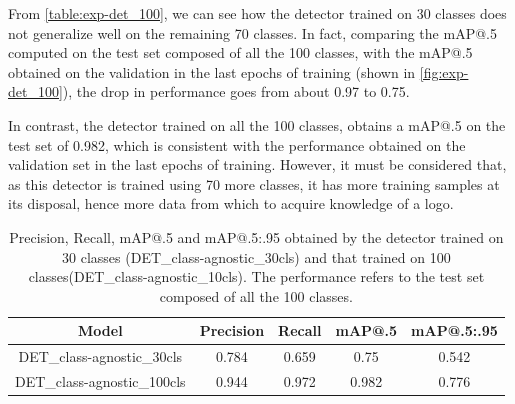 From \autoref{table:exp-det_100}, we can see how the detector trained on 30 classes does not generalize well on the remaining 70 classes.
In fact, comparing the mAP@.5 computed on the test set composed of all the 100 classes, with the mAP@.5 obtained on the validation in the last epochs of training (shown in \autoref{fig:exp-det_100}), the drop in performance goes from about 0.97 to 0.75.

In contrast, the detector trained on all the 100 classes, obtains a mAP@.5 on the test set of 0.982, which is consistent with the performance obtained on the validation set in the last epochs of training.
However, it must be considered that, as this detector is trained using 70 more classes, it has more training samples at its disposal, hence more data from which to acquire knowledge of a logo.


\begin{table}[H]
    \centering
    \begin{tabular}{c|c|c|c|c}
        \hline
        \textbf{Model} &
        \textbf{Precision} &
        \textbf{Recall} &
        \textbf{mAP@.5} &
        \textbf{mAP@.5:.95} \\
        \hline
        \hline
DET\_class-agnostic\_30cls&0.784&0.659&0.75&0.542\\
DET\_class-agnostic\_100cls&0.944&0.972&0.982&0.776\\
\hline
\end{tabular}
\caption{Precision, Recall, mAP@.5 and mAP@.5:.95 obtained by the detector trained on 30 classes (DET\_class-agnostic\_30cls) and that trained on 100 classes(DET\_class-agnostic\_10cls). The performance refers to the test set composed of all the 100 classes.}
    \label{table:exp-det_100}
\end{table}

